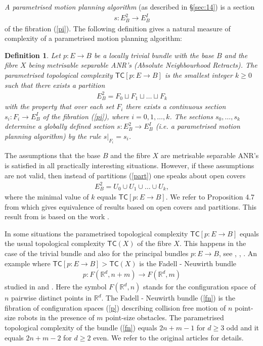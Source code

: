 \documentclass[11pt]{amsart}
\newtheorem{definition}[theorem]{Definition}
\def\R{\mathbb R}
\def\tc{{\mathsf{TC}}}
\begin{document}
{\it A parametrised motion planning algorithm} (as described in \S \ref{sec:14}) is a section
\begin{eqnarray}\label{sec}
s: E^2_B\to E^I_B
\end{eqnarray} 
of the fibration 
(\ref{pi}). The following definition gives a natural measure of complexity of a parametrised motion planning algorithm:

\begin{definition}\label{def1} Let $p: E\to B$ be a locally trivial bundle with the base $B$ and the fibre $X$ being metrisable separable ANR's (Absolute Neighbourhood Retracts). 
The parametrised topological complexity $\tc[p:E\to B]$ is the smallest integer $k\ge 0$ such that there exists
a partition
\begin{eqnarray}\label{part}
E^2_B= F_0\sqcup F_1\sqcup \dots\sqcup F_k
\end{eqnarray}
with the property that over each set $F_i$ there exists a continuous section $s_i:F_i\to E^I_B$ of the fibration (\ref{pi}), where $i=0, 1, \dots, k$. The sections $s_0, \dots, s_k$ determine a globally defined section $s: E^2_B\to E^I_B$ (i.e. a parametrised motion planning algorithm) by the rule $s|_{F_i}=s_i$. 
\end{definition}

The assumptions that the base $B$ and the fibre $X$ are  metrisable separable ANR's is satisfied in all practically interesting situations. However, if these assumptions are not valid, then instead of partitions (\ref{part}) one speaks about open covers 
\begin{eqnarray}\label{cov}
E^2_B= U_0\cup U_1\cup \dots\cup U_k,
\end{eqnarray}
where the minimal value of $k$ equals $\tc[p:E\to B]$. We refer to Proposition 4.7 from \cite{CFW21} 
which gives equivalence of results based on open covers and partitions. This result from \cite{CFW21} is based on the work \cite{GC}. 

In some situations the parametrised topological complexity $\tc[p:E\to B]$ equals the usual topological complexity $\tc(X)$ of the fibre $X$. 
This happens in the case of the trivial bundle and also for the principal bundles $p: E\to B$, see \cite{CFW21}, \cite{CFW22}, \cite{FW23}. 
An example where $\tc[p:E\to B]>\tc(X)$ is the Fadell - Neuwirth bundle 
\begin{eqnarray}\label{fn}
p: F(\R^d, n+m)\to F(\R^d, m)
\end{eqnarray} 
studied in \cite{CFW21} and \cite{CFW22}. Here the symbol $F(\R^d, n)$ stands for the configuration space of $n$ pairwise distinct points in $\R^d$. The Fadell - Neuwirth bundle (\ref{fn})
is the fibration of configuration spaces (\ref{p}) describing collision free motion of $n$ point-size robots in the presence of $m$ point-size obstacles. 
 The parametrised topological complexity of the bundle 
(\ref{fn}) equals $2n+m-1$ for $d\ge 3$ odd and it equals $2n+m-2$ for $d\ge 2$ even. 
We refer to the original articles for details. 
\end{document}
